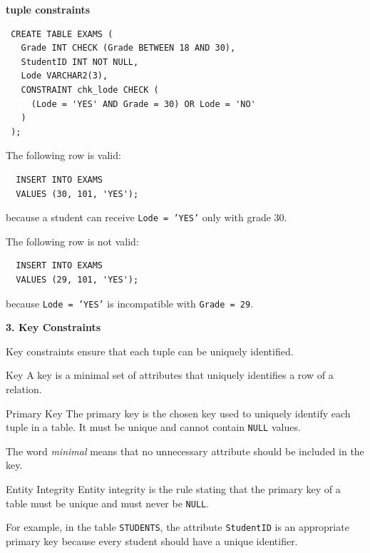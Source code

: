 \begin{example}{\textbf{tuple constraints}}

 \begin{verbatim}
 CREATE TABLE EXAMS (
   Grade INT CHECK (Grade BETWEEN 18 AND 30),
   StudentID INT NOT NULL,
   Lode VARCHAR2(3),
   CONSTRAINT chk_lode CHECK (
     (Lode = 'YES' AND Grade = 30) OR Lode = 'NO'
   )
 );
 \end{verbatim}


  The following row is valid:
  \begin{verbatim}
  INSERT INTO EXAMS
  VALUES (30, 101, 'YES');
  \end{verbatim}

  \vspace{-0.4cm}
  because a student can receive \texttt{Lode = 'YES'} only with grade 30.

  The following row is not valid:
  \begin{verbatim}
  INSERT INTO EXAMS
  VALUES (29, 101, 'YES');
  \end{verbatim}

    \vspace{-0.4cm}
  because \texttt{Lode = 'YES'} is incompatible with \texttt{Grade = 29}.
 \end{example}

 \vspace{0.3cm}
 \textbf{3. Key Constraints}

 Key constraints ensure that each tuple can be uniquely identified.

 \begin{defbox}{Key}
  A key is a minimal set of attributes that uniquely identifies a row of a relation.
 \end{defbox}

 \begin{defbox}{Primary Key}
  The primary key is the chosen key used to uniquely identify each tuple in a table. It must be unique and cannot contain \texttt{NULL} values.
 \end{defbox}

 The word \textit{minimal} means that no unnecessary attribute should be included in the key.

 \begin{defbox}{Entity Integrity}
  Entity integrity is the rule stating that the primary key of a table must be unique and must never be \texttt{NULL}.
 \end{defbox}

 For example, in the table \texttt{STUDENTS}, the attribute \texttt{StudentID} is an appropriate primary key because every student should have a unique identifier.

